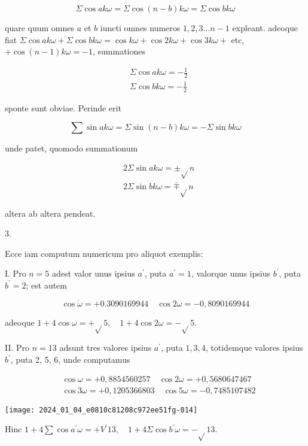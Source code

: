 \documentclass[10pt]{article}
\begin{document}
\[
\Sigma \cos a k \omega=\Sigma \cos (n-b) k \omega=\Sigma \cos b k \omega
\]

quare quum omnes \(a\) et \(b\) iuncti omnes numeros \(1,2,3 \ldots n-1\) expleant. adeoque fiat \(\Sigma \cos a k \omega+\Sigma \cos b k \omega=\cos k \omega+\cos 2 k \omega+\cos 3 k \omega+\) etc, \(+\cos (n-1) k \omega=-1\), summationes

\[
\begin{aligned}
& \Sigma \cos a k \omega=-\frac{1}{2} \\
& \Sigma \cos b k \omega=-\frac{1}{2}
\end{aligned}
\]

sponte sunt obviae. Perinde erit

\[
\sum \sin a k \omega=\Sigma \sin (n-b) k \omega=-\Sigma \sin b k \omega
\]

unde patet, quomodo summationum

\[
\begin{aligned}
& 2 \Sigma \sin a k \omega= \pm \sqrt{ } n \\
& 2 \Sigma \sin b k \omega=\bar{\mp} \sqrt{ } n
\end{aligned}
\]

altera ab altera pendeat.

3.

Ecce iam computum numericum pro aliquot exemplis:

I. Pro \(n=5\) adest valor unus ipsius \(a^{\prime}\), puta \(a^{\prime}=1\), valorque unus ipsius \(b^{\prime}\), puta \(b^{\prime}=2\); est autem

\[
\cos \dot{\omega}=+0.3090169944 \quad \cos 2 \omega=-0,8090169944
\]

adeoque \(1+4 \cos \omega=+\sqrt{ } 5, \quad 1+4 \cos 2 \omega=-\sqrt{ } 5\).

II. Pro \(n=13\) adsunt tres valores ipsius \(a^{\prime}\), puta \(1,3,4\), totidemque valores ipsius \(b^{\prime}\), puta 2, 5, 6, unde computamus

\[
\begin{aligned}
& \cos \omega=+0,8854560257 \quad \cos 2 \omega=+0,5680647467 \\
& \cos 3 \omega=+0,1205366803 \quad \cos 5 \omega=-0,7485107482
\end{aligned}
\]

\begin{center}
\texttt{[image: 2024\_01\_04\_e0810c81208c972ee51fg-014]}
\end{center}

Hinc \(1+4 \sum \cos a^{\prime} \omega=+V^{\prime} 13, \quad 1+4 \Sigma \cos b^{\prime} \omega=-\sqrt{ } 13\).
\end{document}
